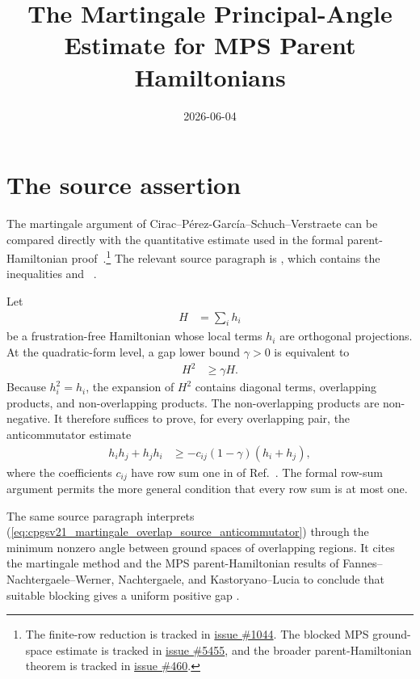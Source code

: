 \documentclass{article}
\title{The Martingale Principal-Angle Estimate for MPS Parent Hamiltonians}
\author{}
\date{2026-06-04}
\begin{document}
\maketitle
{}

\section{The source assertion}

The martingale argument of
Cirac--P\'erez-Garc\'ia--Schuch--Verstraete can be compared directly with the
quantitative estimate used in the formal parent-Hamiltonian
proof~\cite[Section~IV.C]{Cirac2021Matrix}.\footnote{The finite-row reduction
    is tracked in
    \href{https://github.com/LionSR/TNLean/issues/1044}{issue \#1044}.
    The blocked MPS ground-space estimate is tracked in
    \href{https://github.com/LionSR/TNLean/issues/5455}{issue \#5455}, and the
    broader parent-Hamiltonian theorem is tracked in
    \href{https://github.com/LionSR/TNLean/issues/460}{issue \#460}.}
The relevant source paragraph is , which contains the
inequalities  and
~\cite[Section~IV.C]{Cirac2021Matrix}.

Let
\begin{align}
    H & =\sum_i h_i
    \label{eq:cpgsv21_martingale_overlap_hamiltonian_sum}
\end{align}
be a frustration-free Hamiltonian whose local terms $h_i$ are orthogonal
projections. At the quadratic-form level, a gap lower bound $\gamma>0$ is
equivalent to
\begin{align}
    H^2 & \geq\gamma H.
    \label{eq:cpgsv21_martingale_overlap_gap_quadratic_form}
\end{align}
Because $h_i^2=h_i$, the expansion of $H^2$ contains diagonal terms,
overlapping products, and non-overlapping products. The non-overlapping
products are non-negative. It therefore suffices to prove, for every
overlapping pair, the anticommutator estimate
\begin{align}
    h_i h_j+h_j h_i
     & \geq-c_{ij}(1-\gamma)(h_i+h_j),
    \label{eq:cpgsv21_martingale_overlap_source_anticommutator}
\end{align}
where the coefficients $c_{ij}$ have row sum one in
 of
Ref.~\cite[Section~IV.C]{Cirac2021Matrix}. The formal row-sum argument permits
the more general condition that every row sum is at most one.

The same source paragraph interprets
(\ref{eq:cpgsv21_martingale_overlap_source_anticommutator}) through the
minimum nonzero angle between ground spaces of overlapping regions. It cites
the martingale method and the MPS parent-Hamiltonian results of
Fannes--Nachtergaele--Werner, Nachtergaele, and Kastoryano--Lucia to conclude
that suitable blocking gives a uniform positive gap
\cite{Fannes1992Finitely,Nachtergaele1996Spectral,Kastoryano2018Martingale}.
\end{document}
